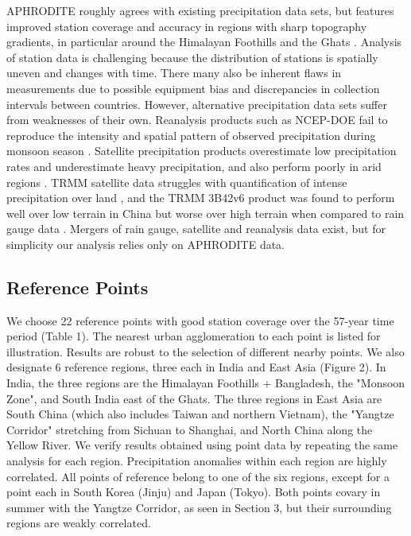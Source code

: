 \documentclass[12pt]{article}
\begin{document}
	
	APHRODITE roughly agrees with existing precipitation data sets, but features improved station coverage and accuracy in regions with sharp topography gradients, in particular around the Himalayan Foothills and the Ghats \citep{Yatagai2012}. Analysis of station data is challenging because the distribution of stations is spatially uneven and changes with time. There many also be inherent flaws in measurements due to possible equipment bias and discrepancies in collection intervals between countries. However, alternative precipitation data sets suffer from weaknesses of their own. Reanalysis products such as NCEP-DOE fail to reproduce the intensity and spatial pattern of observed precipitation during monsoon season \citep{Pena-Arancibia2013}. Satellite precipitation products overestimate low precipitation rates and underestimate heavy precipitation, and also perform poorly in arid regions \citep{Gao2013a}. TRMM satellite data struggles with quantification of intense precipitation over land \citep{Iguchi2009}, and the TRMM 3B42v6 product was found to perform well over low terrain in China but worse over high terrain when compared to rain gauge data \citep{Zhao2013}. Mergers of rain gauge, satellite and reanalysis data exist, but for simplicity our analysis relies only on APHRODITE data.
		
\subsection{Reference Points}
	
	We choose 22 reference points with good station coverage over the 57-year time period (Table 1). The nearest urban agglomeration to each point is listed for illustration. Results are robust to the selection of different nearby points. We also designate 6 reference regions, three each in India and East Asia (Figure 2). In India, the three regions are the Himalayan Foothills + Bangladesh, the "Monsoon Zone", and South India east of the Ghats. The three regions in East Asia are South China (which also includes Taiwan and northern Vietnam), the "Yangtze Corridor" stretching from Sichuan to Shanghai, and North China along the Yellow River. We verify results obtained using point data by repeating the same analysis for each region. Precipitation anomalies within each region are highly correlated. All points of reference belong to one of the six regions, except for a point each in South Korea (Jinju) and Japan (Tokyo). Both points covary in summer with the Yangtze Corridor, as seen in Section 3, but their surrounding regions are weakly correlated. 
	
\end{document}
